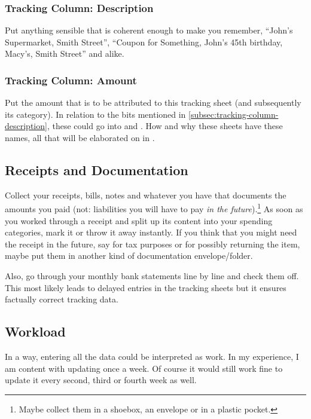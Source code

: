 \subsubsection{Tracking Column: Description}
\label{subsec:tracking-column-description}

Put anything sensible that is coherent enough to make you remember, \eg ``John's Supermarket, Smith Street'', ``Coupon for Something, John's 45th birthday, Macy's, Smith Street'' and alike.

\subsubsection{Tracking Column: Amount}
\label{subsec:tracking-column-amount}

Put the amount that is to be attributed to this tracking sheet (and subsequently its category).
In relation to the bits mentioned in \autoref{subsec:tracking-column-description}, these could go into  and .
How and why these sheets have these names, all that will be elaborated on in .

\subsection{Receipts and Documentation}
\label{subsec:receipts}

Collect your receipts, bills, notes and whatever you have that documents the amounts you paid (not: liabilities you will have to pay \emph{in the future}).\footnote{Maybe collect them in a shoebox, an envelope or in a plastic pocket.}
As soon as you worked through a receipt and split up its content into your spending categories, mark it or throw it away instantly.
If you think that you might need the receipt in the future, say for tax purposes or for possibly returning the item, maybe put them in another kind of documentation envelope/folder.

Also, go through your monthly bank statements line by line and check them off.
This most likely leads to delayed entries in the tracking sheets but it ensures factually correct tracking data.

\subsection{Workload}
\label{subsec:workload}

In a way, entering all the data could be interpreted as work.
In my experience, I am content with updating \tfn once a week.
Of course it would still work fine to update it every second, third or fourth week as well.


